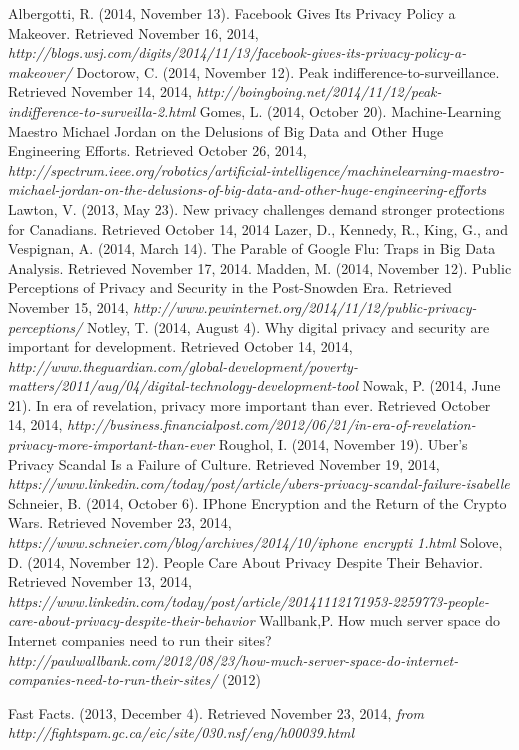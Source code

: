 \documentclass[12pt]{article}
\begin{document}
\clearpage
\begin{thebibliography}{99}
	Albergotti, R. (2014, November 13). Facebook Gives Its Privacy Policy a Makeover. Retrieved November 16, 2014, {\sl http://blogs.wsj.com/digits/2014/11/13/facebook-gives-its-privacy-policy-a-makeover/}
	Doctorow, C. (2014, November 12). Peak indifference-to-surveillance. Retrieved November 14, 2014, {\sl http://boingboing.net/2014/11/12/peak-indifference-to-surveilla-2.html}
	Gomes, L. (2014, October 20). Machine-Learning Maestro Michael Jordan on the Delusions of Big Data and Other Huge Engineering Efforts. Retrieved October 26, 2014, {\sl http://spectrum.ieee.org/robotics/artificial-intelligence/machinelearning-maestro-michael-jordan-on-the-delusions-of-big-data-and-other-huge-engineering-efforts}
	Lawton, V. (2013, May 23). New privacy challenges demand stronger protections for Canadians. Retrieved October 14, 2014
	Lazer, D., Kennedy, R., King, G., and Vespignan, A. (2014, March 14). The Parable of Google Flu: Traps in Big Data Analysis. Retrieved November 17, 2014.
	Madden, M. (2014, November 12). Public Perceptions of Privacy and Security in the Post-Snowden Era. Retrieved November 15, 2014, {\sl http://www.pewinternet.org/2014/11/12/public-privacy-perceptions/}
	Notley, T. (2014, August 4). Why digital privacy and security are important for development. Retrieved October 14, 2014, {\sl http://www.theguardian.com/global-development/poverty-matters/2011/aug/04/digital-technology-development-tool}
	Nowak, P. (2014, June 21). In era of revelation, privacy more important than ever. Retrieved October 14, 2014, {\sl http://business.financialpost.com/2012/06/21/in-era-of-revelation-privacy-more-important-than-ever}
	Roughol, I. (2014, November 19). Uber's Privacy Scandal Is a Failure of Culture. Retrieved November 19, 2014, {\sl
	https://www.linkedin.com/today/post/article/ubers-privacy-scandal-failure-isabelle}
	Schneier, B. (2014, October 6). IPhone Encryption and the Return of the Crypto Wars. Retrieved November 23, 2014, {\sl https://www.schneier.com/blog/archives/2014/10/iphone \textunderscore encrypti \textunderscore 1.html}
	Solove, D. (2014, November 12). People Care About Privacy Despite Their Behavior. Retrieved November 13, 2014, {\sl https://www.linkedin.com/today/post/article/20141112171953-2259773-people-care-about-privacy-despite-their-behavior}
	Wallbank,P. How much server space do Internet companies need to run their sites? {\sl http://paulwallbank.com/2012/08/23/how-much-server-space-do-internet-companies-need-to-run-their-sites/} (2012)

	Fast Facts. (2013, December 4). Retrieved November 23, 2014, {\sl from http://fightspam.gc.ca/eic/site/030.nsf/eng/h\textunderscore00039.html}
\end{thebibliography}
\end{document}
